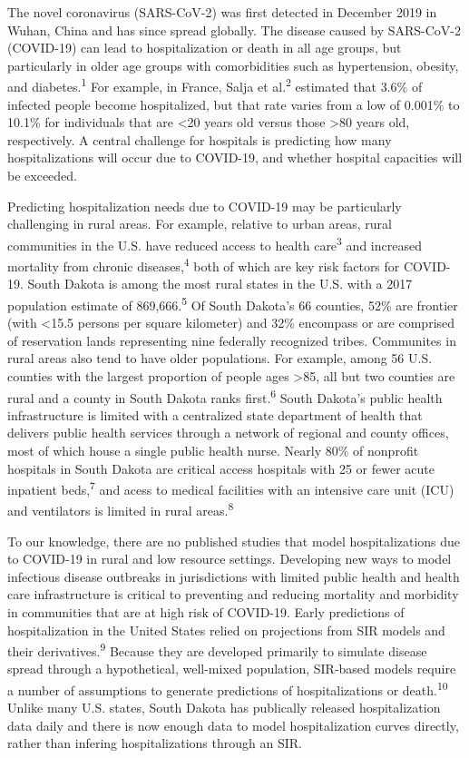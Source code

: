 \documentclass[
]{article}
\begin{document}
The novel coronavirus (SARS-CoV-2) was first detected in December 2019 in Wuhan, China and has since spread globally. The disease caused by SARS-CoV-2 (COVID-19) can lead to hospitalization or death in all age groups, but particularly in older age groups with comorbidities such as hypertension, obesity, and diabetes.\textsuperscript{1} For example, in France, Salja et al.\textsuperscript{2} estimated that 3.6\% of infected people become hospitalized, but that rate varies from a low of 0.001\% to 10.1\% for individuals that are \textless20 years old versus those \textgreater80 years old, respectively. A central challenge for hospitals is predicting how many hospitalizations will occur due to COVID-19, and whether hospital capacities will be exceeded.

Predicting hospitalization needs due to COVID-19 may be particularly challenging in rural areas. For example, relative to urban areas, rural communities in the U.S. have reduced access to health care\textsuperscript{3} and increased mortality from chronic diseases,\textsuperscript{4} both of which are key risk factors for COVID-19. South Dakota is among the most rural states in the U.S. with a 2017 population estimate of 869,666.\textsuperscript{5} Of South Dakota's 66 counties, 52\% are frontier (with \textless15.5 persons per square kilometer) and 32\% encompass or are comprised of reservation lands representing nine federally recognized tribes. Communites in rural areas also tend to have older populations. For example, among 56 U.S. counties with the largest proportion of people ages \textgreater85, all but two counties are rural and a county in South Dakota ranks first.\textsuperscript{6} South Dakota's public health infrastructure is limited with a centralized state department of health that delivers public health services through a network of regional and county offices, most of which house a single public health nurse. Nearly 80\% of nonprofit hospitals in South Dakota are critical access hospitals with 25 or fewer acute inpatient beds,\textsuperscript{7} and acess to medical facilities with an intensive care unit (ICU) and ventilators is limited in rural areas.\textsuperscript{8}

To our knowledge, there are no published studies that model hospitalizations due to COVID-19 in rural and low resource settings. Developing new ways to model infectious disease outbreaks in jurisdictions with limited public health and health care infrastructure is critical to preventing and reducing mortality and morbidity in communities that are at high risk of COVID-19. Early predictions of hospitalization in the United States relied on projections from SIR models and their derivatives.\textsuperscript{9} Because they are developed primarily to simulate disease spread through a hypothetical, well-mixed population, SIR-based models require a number of assumptions to generate predictions of hospitalizations or death.\textsuperscript{10} Unlike many U.S. states, South Dakota has publically released hospitalization data daily and there is now enough data to model hospitalization curves directly, rather than infering hospitalizations through an SIR.
\end{document}
